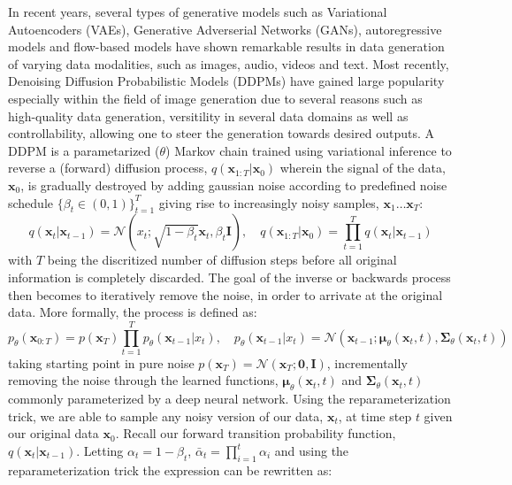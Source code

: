 In recent years, several types of generative models such as Variational Autoencoders (VAEs), Generative Adverserial Networks (GANs), autoregressive models and flow-based models have shown remarkable results in data generation of varying data modalities, such as images, audio, videos and text. Most recently, Denoising Diffusion Probabilistic Models (DDPMs) have gained large popularity especially within the field of image generation due to several reasons such as high-quality data generation, versitility in several data domains as well as controllability, allowing one to steer the generation towards desired outputs.
A DDPM is a parametarized ($\theta$) Markov chain trained using variational inference to reverse a (forward) diffusion process, $q(\mathbf{x}_{1:T} \vert \mathbf{x}_0)$ wherein the signal of the data, $\mathbf{x}_0$, is gradually destroyed by adding gaussian noise according to predefined noise schedule $\{\beta_t  \in (0,1) \}_{t=1}^T$ giving rise to increasingly noisy samples, $\mathbf{x}_1 \ldots \mathbf{x}_T$:
\begin{equation}    
    q(\mathbf{x}_{t} \vert \mathbf{x}_{t-1}) = \mathcal{N}(x_{t}; \sqrt{1 - \beta_t}\mathbf{x}_t,\beta_t \mathbf{I} ), \quad  q(\mathbf{x}_{1:T} \vert \mathbf{x}_{0}) = \prod_{t=1}^T q(\mathbf{x}_{t} \vert \mathbf{x}_{t-1})
\end{equation}
with $T$ being the discritized number of diffusion steps before all original information is completely discarded. The goal of the inverse or backwards process then becomes to iteratively remove the noise, in order to arrivate at the original data. More formally, the process is defined as:
\begin{equation}
    p_\theta(\mathbf{x}_{0:T}) = p(\mathbf{x}_T) \prod_{t=1}^T p_\theta(\mathbf{x}_{t-1} \vert x_{t}), \quad p_\theta(\mathbf{x}_{t-1} \vert x_{t}) = \mathcal{N}(\mathbf{x}_{t-1}; \mathbf{\mu}_\theta(\mathbf{x}_t, t), \mathbf{\Sigma}_\theta(\mathbf{x}_t, t))
\end{equation}
taking starting point in pure noise $p(\mathbf{x}_T) = \mathcal{N}(\mathbf{x}_T; \mathbf{0}, \mathbf{I})$, incrementally removing the noise through the learned functions, $\mathbf{\mu}_\theta(\mathbf{x}_t, t)$ and $\mathbf{\Sigma}_\theta(\mathbf{x}_t, t)$ commonly parameterized by a deep neural network.
Using the reparameterization trick, we are able to sample any noisy version of our data, $\mathbf{x}_t$, at time step $t$ given our original data $\mathbf{x}_0$. Recall our forward transition probability function, $q(\mathbf{x}_t \vert \mathbf{x}_{t-1})$. Letting $\alpha_t = 1 - \beta_t$, $\bar{\alpha}_t = \prod_{i=1}^t \alpha_i$ and using the reparameterization trick the expression can be rewritten as:
